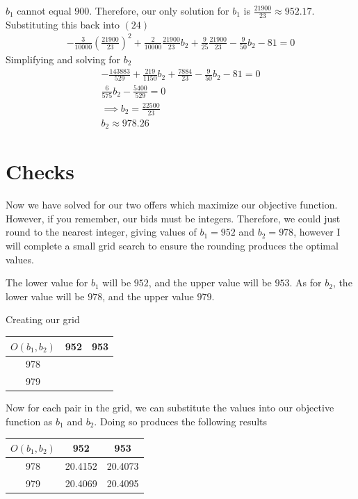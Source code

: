 \documentclass{article}
\begin{document}
$b_1$ cannot equal $900$. Therefore, our only solution for $b_1$ is $\frac{21900}{23} \approx 952.17$.
Substituting this back into $(24)$
\begin{gather}
    -\frac{3}{10000}\left(\frac{21900}{23}\right)^2 + \frac{2}{10000}\frac{21900}{23}b_2+\frac{9}{25}\frac{21900}{23} - \frac{9}{50}b_2 - 81 = 0
\end{gather}
Simplifying and solving for $b_2$
\begin{gather}
    -\frac{143883}{529} + \frac{219}{1150}b_2 + \frac{7884}{23} - \frac{9}{50}b_2 - 81 = 0\\
    \frac{6}{575}b_2 - \frac{5400}{529} = 0 \\
    \implies b_2 = \frac{22500}{23} \\
    b_2 \approx 978.26
\end{gather}

\section*{Checks}
Now we have solved for our two offers which maximize our objective function.
However, if you remember, our bids must be integers. Therefore, we could just round
to the nearest integer, giving values of $b_1 = 952$ and $b_2 = 978$, however I will
complete a small grid search to ensure the rounding produces the optimal values.

The lower value for $b_1$ will be $952$, and the upper value will be $953$. As for $b_2$,
the lower value will be $978$, and the upper value $979$.

Creating our grid
\begin{center}
    \begin{tabular}{ |c|c|c| }
        \hline
        $O(b_1, b_2)$& 952 & 953 \\
        \hline
        978 & & \\
        \hline
        979 & & \\
        \hline
    \end{tabular}
\end{center}

Now for each pair in the grid, we can substitute the values into our 
objective function as $b_1$ and $b_2$. Doing so produces the following results
\begin{center}
    \begin{tabular}{ |c|c|c| }
        \hline
        $O(b_1, b_2)$ & 952 & 953 \\
        \hline
        978 & 20.4152 & 20.4073 \\
        \hline
        979 & 20.4069 & 20.4095 \\
        \hline
    \end{tabular}
\end{center}
\end{document}
